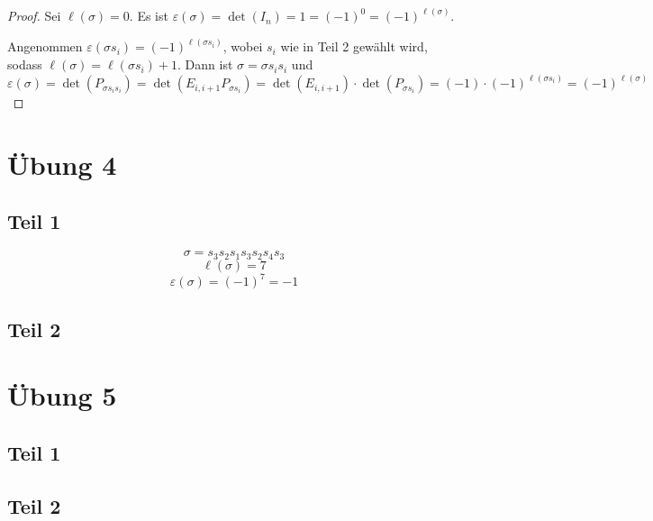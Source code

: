 \documentclass[10pt,a4paper]{article}
\begin{document}
\begin{proof}
Sei $\ell(\sigma) = 0$.
Es ist $\varepsilon(\sigma) = \det(I_{n}) = 1 = (-1)^{0} = (-1)^{\ell(\sigma)}$.

Angenommen $\varepsilon(\sigma s_{i}) = (-1)^{\ell(\sigma s_{i})}$, wobei $s_{i}$ wie in Teil 2 gewählt wird, sodass $\ell(\sigma) = \ell(\sigma s_{i}) + 1$.
Dann ist $\sigma = \sigma s_{i} s_{i}$ und
\begin{equation}
\varepsilon(\sigma) = \det(P_{\sigma s_{i} s_{i}}) = \det(E_{i,i + 1}P_{\sigma s_{i}}) = \det(E_{i,i + 1}) \cdot \det(P_{\sigma s_{i}}) = (-1) \cdot (-1)^{\ell(\sigma s_{i})} = (-1)^{\ell(\sigma)}
\end{equation}
\end{proof}

\section*{Übung 4}

\subsection*{Teil 1}

\begin{equation}
\sigma = s_{3}s_{2}s_{1}s_{3}s_{2}s_{4}s_{3}
\end{equation}
\begin{equation}
\ell(\sigma) = 7
\end{equation}
\begin{equation}
\varepsilon(\sigma) = (-1)^{7} = -1
\end{equation}

\subsection*{Teil 2}

\section*{Übung 5}

\subsection*{Teil 1}

\subsection*{Teil 2}
\end{document}

